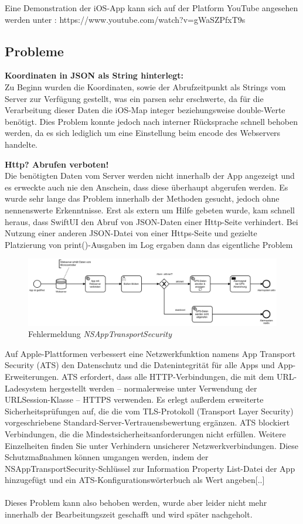Eine Demonstration der iOS-App kann sich auf der Platform YouTube angesehen werden unter : https://www.youtube.com/watch?v=gWaSZPfxT9s

\subsection{Probleme}
\textbf{Koordinaten in JSON als String hinterlegt:}
\\
Zu Beginn wurden die Koordinaten, sowie der Abrufzeitpunkt als Strings vom Server zur Verfügung gestellt, was ein parsen sehr erschwerte, da für die Verarbeitung dieser Daten die iOS-Map integer beziehungsweise double-Werte benötigt. Dies Problem konnte jedoch nach interner Rücksprache schnell behoben werden, da es sich lediglich um eine Einstellung beim encode des Webservers handelte.

\textbf{Http? Abrufen verboten!}
\\
Die benötigten Daten vom Server werden nicht innerhalb der App angezeigt und es erweckte auch nie den Anschein, dass diese überhaupt abgerufen werden. Es wurde sehr lange das Problem innerhalb der Methoden gesucht, jedoch ohne nennenswerte Erkenntnisse. Erst als extern um Hilfe gebeten wurde, kam schnell heraus, dass SwiftUI den Abruf von JSON-Daten einer Http-Seite verhindert. Bei Nutzung einer anderen JSON-Datei von einer Https-Seite und gezielte Platzierung von print()-Ausgaben im Log ergaben dann das eigentliche Problem
 
\begin{figure} [H]
	\begin{center}
		\includegraphics[width=1\textwidth]{Bilder/iOS_camunda.png}
		\caption{Fehlermeldung \textit{NSAppTransportSecurity}}
		\label{fehler}
	\end{center}
\end{figure}
Auf Apple-Plattformen verbessert eine Netzwerkfunktion namens App Transport Security (ATS) den Datenschutz und die Datenintegrität für alle Apps und App-Erweiterungen. ATS erfordert, dass alle HTTP-Verbindungen, die mit dem URL-Ladesystem hergestellt werden – normalerweise unter Verwendung der URLSession-Klasse – HTTPS verwenden. Es erlegt außerdem erweiterte Sicherheitsprüfungen auf, die die vom TLS-Protokoll (Transport Layer Security) vorgeschriebene Standard-Server-Vertrauensbewertung ergänzen. ATS blockiert Verbindungen, die die Mindestsicherheitsanforderungen nicht erfüllen. Weitere Einzelheiten finden Sie unter Verhindern unsicherer Netzwerkverbindungen. Diese Schutzmaßnahmen können umgangen werden, indem der NSAppTransportSecurity-Schlüssel zur Information Property List-Datei der App hinzugefügt und ein ATS-Konfigurationswörterbuch als Wert angeben[..] \cite{Inc}
\\
\\
Dieses Problem kann also behoben werden, wurde aber leider nicht mehr innerhalb der Bearbeitungszeit geschafft und wird später nachgeholt.